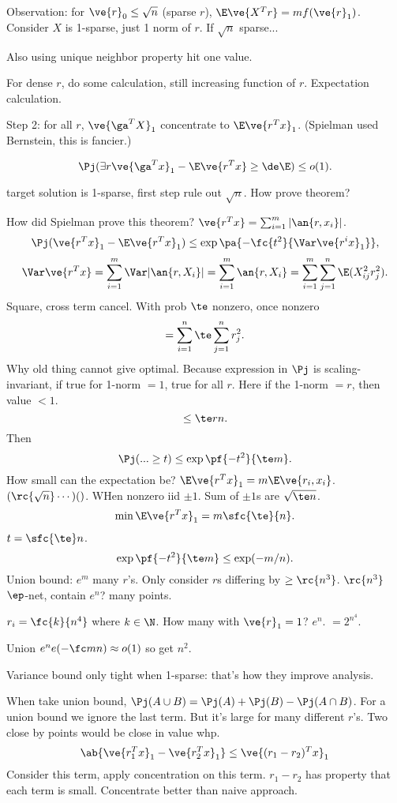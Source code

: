 Observation: for $\ve{r}_0\le \sqrt n$ (sparse $r$), $\E\ve{X^T r} = mf(\ve{r}_1)$. Consider $X$ is 1-sparse, just 1 norm of $r$. If $\sqrt n$ sparse...

Also using unique neighbor property hit one value.

For dense $r$, do some calculation, still increasing function of $r$. Expectation calculation.

Step 2: for all $r$, $\ve{\ga^TX}_1$ concentrate to $\E\ve{r^Tx}_1$. (Spielman used Bernstein, this is fancier.)

\[
\Pj(\exists r\ve{\ga^Tx}_1-\E\ve{r^Tx}\ge \de\E)\le o(1).
\]


target solution is 1-sparse, first step rule out $\sqrt n$. How prove theorem? 

How did Spielman prove this theorem? $\ve{r^Tx}=\sum_{i=1}^m|\an{r,x_i}|$. 
\[
\Pj(\ve{r^Tx}_1-\E\ve{r^Tx}_1) \le \exp\pa{-\fc{t^2}{\Var \ve{r^ix}_1}},
\]
\[
\Var\ve{r^Tx} = \sum_{i=1}^m \Var|\an{r,X_i}| = \sum_{i=1}^m \an{r,X_i}=\sum_{i=1}^m\sum_{j=1}^n \E(X_{ij}^2r_j^2).
\]
Square, cross term cancel. With prob $\te$ nonzero, once nonzero
\[
=\sum_{i=1}^n \te\sum_{j=1}^n r_j^2.
\]
Why old thing cannot give optimal.
Because expression in $\Pj$ is scaling-invariant, if true for 1-norm $=1$, true for all $r$.
Here if the 1-norm $=r$, then value $<1$. 
\[
\le \te rn.
\]
Then
\[
\Pj(...\ge t)\le \exp\pf{-t^2}{\te m}.
\]
How small can the expectation be? $\E\ve{r^Tx}_1 = m\E\ve{r_i,x_i}$. $(\rc{\sqrt n}\cdots)()$. WHen nonzero iid $\pm1$. %
Sum of $\pm 1$s are $\sqrt{\te n}$. 
\[
\min \E\ve{r^Tx}_1 = m\sfc{\te}{n}.
\]
$t=\sfc{\te}n$. 
\[
\exp\pf{-t^2}{\te m}\le \exp(-m/n).
\]
Union bound: $e^m$ many $r$'s. Only consider $r$s differing by $\ge\rc{n^3}$. $\rc{n^3}$ $\ep$-net, contain $e^n$? many points.

$r_i=\fc{k}{n^4}$ where $k\in \N$. %
How many with $\ve{r}_1=1$? $e^n$. $=2^{n^4}$. %

Union $e^ne(-\fc mn)\approx o(1)$ so get $n^2$. %

Variance bound only tight when 1-sparse: that's how they improve analysis.

When take union bound, $\Pj(A\cup B)=\Pj(A)+\Pj(B)-\Pj(A\cap B)$. For a union bound we ignore the last term. But it's large for many different $r$'s. Two close by points would be close in value whp. 
\[
\ab{\ve{r_1^Tx}_1-\ve{r_2^Tx}_1}\le \ve{(r_1-r_2)^T x}_1
\]
Consider this term, apply concentration on this term. $r_1-r_2$ has property that each term is small. Concentrate better than naive approach. 

